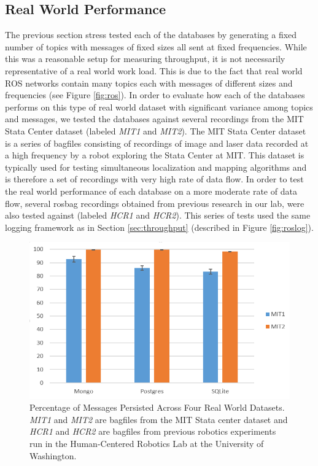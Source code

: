 \documentclass[nocopyrightspace]{acm_proc_article-sp}
\begin{document}
\subsection{Real World Performance}
\label{sec:realworld}
The previous section stress tested each of the databases by generating a fixed number of topics with messages of fixed sizes all sent at fixed frequencies. While this was a reasonable setup for measuring throughput, it is not necessarily representative of a real world work load. This is due to the fact that real world ROS networks contain many topics each with messages of different sizes and frequencies (see Figure \ref{fig:ros}). In order to evaluate how each of the databases performs on this type of real world dataset with significant variance among topics and messages, we tested the databases against several recordings from the MIT Stata Center dataset (labeled \textit{MIT1} and \textit{MIT2}). The MIT Stata Center dataset is a series of bagfiles consisting of recordings of image and laser data recorded at a high frequency by a robot exploring the Stata Center at MIT. This dataset is typically used for testing simultaneous localization and mapping algorithms and is therefore a set of recordings with very high rate of data flow. In order to test the real world performance of each database on a more moderate rate of data flow, several rosbag recordings obtained from previous research in our lab, were also tested against (labeled \textit{HCR1} and \textit{HCR2}). This series of tests used the same logging framework as in Section \ref{sec:throughput} (described in Figure \ref{fig:roslog}).

\begin{figure}
    \centering
    \includegraphics[width=\linewidth]{images/realworld}
    \caption{Percentage of Messages Persisted Across Four Real World Datasets. \textit{MIT1} and \textit{MIT2} are bagfiles from the MIT Stata center dataset and \textit{HCR1} and \textit{HCR2} are bagfiles from previous robotics experiments run in the Human-Centered Robotics Lab at the University of Washington.}
    \label{fig:realworld}
\end{figure}
\end{document}
